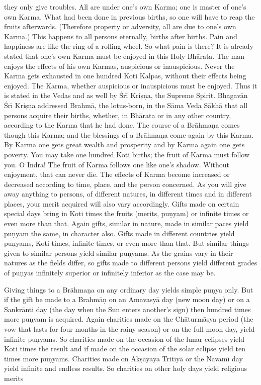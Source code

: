 they only give troubles. All are under one's own Karma; one is master of one's own Karma. What had been done in previous births, so one will have to reap the fruits afterwards. (Therefore property or adversity, all are due to one's own Karma.) This happens to all persons eternally, births after births. Pain and happiness are like the ring of a rolling wheel. So what pain is there? It is already stated that one's own Karma must be enjoyed in this Holy Bh\=arata. The man enjoys the effects of his own Karmas, auspicious or inauspicious. Never the Karma gets exhausted in one hundred Koti Kalpas, without their effects being enjoyed. The Karma, whether auspicious or inauspicious must be enjoyed. Thus it is stated in the Vedas and as well by \'Sr\={\i} Kri\d{s}\d{n}a, the Supreme Spirit. Bhagav\=an \'Sr\={\i} Kri\d{s}\d{n}a addressed Brahm\=a, the lotus-born, in the S\=ama Veda S\=akh\=a that all persons acquire their births, whether, in Bh\=arata or in any other country, according to the Karma that he had done. The course of a Br\=ahma\d{n}a comes though this Karma; and the blessings of a Br\=ahma\d{n}a come again by this Karma. By Karma one gets great wealth and prosperity and by Karma again one gets poverty. You may take one hundred Koti births; the fruit of Karma must follow you. O Indra! The fruit of Karma follows one like one's shadow. Without enjoyment, that can never die. The effects of Karma become increased or decreased according to time, place, and the person concerned. As you will give away anything to persons, of different natures, in different times and in different places, your merit acquired will also vary accordingly. Gifts made on certain special days bring in Koti times the fruits (merits, pu\d{n}yam) or infinite times or even more than that. Again gifts, similar in nature, made in similar paces yield pu\d{n}yam the same, in character also. Gifts made in different countries yield pu\d{n}yams, Koti times, infinite times, or even more than that. But similar things given to similar persons yield similar pu\d{n}yams. As the grains vary in their natures as the fields differ, so gifts made to different persons yield different grades of pu\d{n}yas infinitely superior or infinitely inferior as the case may be.

Giving things to a Br\=ahma\d{n}a on any ordinary day yields simple pu\d{n}ya only. But if the gift be made to a Brahm\=a\d{n} on an Amavasy\=a day (new moon day) or on a Sankr\=anti day (the day when the Sun enters another's sign) then hundred times more pu\d{n}yam is acquired. Again charities made on the Ch\=aturm\=asya period (the vow that lasts for four months in the rainy season) or on the full moon day, yield infinite pu\d{n}yams. So charities made on the occasion of the lunar eclipses yield Koti times the result and if made on the occasion of the solar eclipse yield ten times more pu\d{n}yams. Charities made on Ak\d{s}ayaya Trit\={\i}y\=a or the Navam\={\i} day yield infinite and endless results. So charities on other holy days yield religious merits

